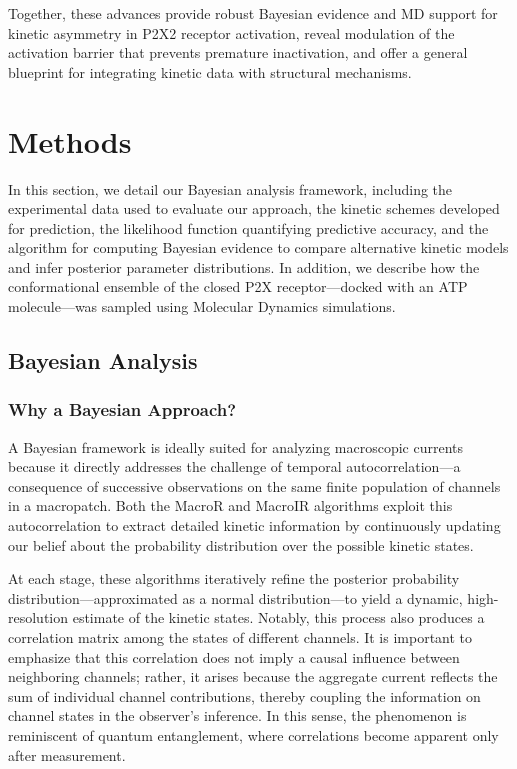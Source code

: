 \documentclass[pdflatex,sn-nature]{sn-jnl}%
\begin{document}
Together, these advances provide robust Bayesian evidence and MD support for kinetic asymmetry in P2X2 receptor activation, reveal modulation of the activation barrier that prevents premature inactivation, and offer a general blueprint for integrating kinetic data with structural mechanisms.

\section{Methods}\label{sec:methods}

In this section, we detail our Bayesian analysis framework, including the experimental data used to evaluate our approach, the kinetic schemes developed for prediction, the likelihood function quantifying predictive accuracy, and the algorithm for computing Bayesian evidence to compare alternative kinetic models and infer posterior parameter distributions. In addition, we describe how the conformational ensemble of the closed P2X receptor—docked with an ATP molecule—was sampled using Molecular Dynamics simulations.

\subsection{Bayesian Analysis}
\subsubsection{Why a Bayesian Approach?}
A Bayesian framework is ideally suited for analyzing macroscopic currents because it directly addresses the challenge of temporal autocorrelation—a consequence of successive observations on the same finite population of channels in a macropatch. Both the MacroR and MacroIR algorithms exploit this autocorrelation to extract detailed kinetic information by continuously updating our belief about the probability distribution over the possible kinetic states.

At each stage, these algorithms iteratively refine the posterior probability distribution—approximated as a normal distribution—to yield a dynamic, high-resolution estimate of the kinetic states. Notably, this process also produces a correlation matrix among the states of different channels. It is important to emphasize that this correlation does not imply a causal influence between neighboring channels; rather, it arises because the aggregate current reflects the sum of individual channel contributions, thereby coupling the information on channel states in the observer’s inference. In this sense, the phenomenon is reminiscent of quantum entanglement, where correlations become apparent only after measurement.
\end{document}
